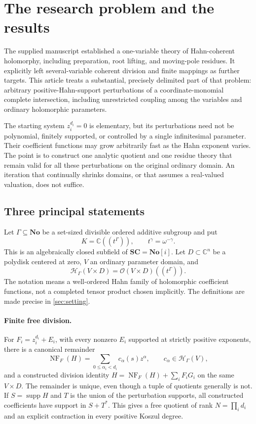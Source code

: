 \documentclass[11pt,letterpaper]{article}
\theoremstyle{definition}
\theoremstyle{remark}
\newcommand{\No}{\mathbf{No}}
\newcommand{\SC}{\mathbf{SC}}
\newcommand{\C}{\mathbb C}
\newcommand{\OO}{\mathcal O}
\newcommand{\HH}{\mathcal H}
\newcommand{\supp}{\operatorname{supp}}
\newcommand{\NF}{\operatorname{NF}}
\numberwithin{equation}{section}
\begin{document}
\section{The research problem and the results}\label{sec:intro}
The supplied manuscript \cite{Supplied} established a one-variable theory of Hahn-coherent holomorphy, including preparation, root lifting, and moving-pole residues. It explicitly left several-variable coherent division and finite mappings as further targets. This article treats a substantial, precisely delimited part of that problem: arbitrary positive-Hahn-support perturbations of a coordinate-monomial complete intersection, including unrestricted coupling among the variables and ordinary holomorphic parameters.

The starting system $z_i^{d_i}=0$ is elementary, but its perturbations need not be polynomial, finitely supported, or controlled by a single infinitesimal parameter. Their coefficient functions may grow arbitrarily fast as the Hahn exponent varies. The point is to construct one analytic quotient and one residue theory that remain valid for all these perturbations on the original ordinary domain. An iteration that continually shrinks domains, or that assumes a real-valued valuation, does not suffice.

\subsection{Three principal statements}
Let $\Gamma\subseteq\No$ be a set-sized divisible ordered additive subgroup and put
\[
 K=\C((t^\Gamma)),\qquad t^\gamma=\omega^{-\gamma}.
\]
This is an algebraically closed subfield of $\SC=\No[i]$. Let $D\subset\C^n$ be a polydisk centered at zero, $V$ an ordinary parameter domain, and
\[
 \HH_\Gamma(V\times D)=\OO(V\times D)((t^\Gamma)).
\]
The notation means a well-ordered Hahn family of holomorphic coefficient functions, not a completed tensor product chosen implicitly. The definitions are made precise in \cref{sec:setting}.

\paragraph{Finite free division.}
For $F_i=z_i^{d_i}+E_i$, with every nonzero $E_i$ supported at strictly positive exponents, there is a canonical remainder
\[
 \NF_F(H)=\sum_{0\le\alpha_i<d_i}c_\alpha(s)z^\alpha,
 \qquad c_\alpha\in\HH_\Gamma(V),
\]
and a constructed division identity $H=\NF_F(H)+\sum_i F_iG_i$ on the same $V\times D$. The remainder is unique, even though a tuple of quotients generally is not. If $S=\supp H$ and $T$ is the union of the perturbation supports, all constructed coefficients have support in $S+T^*$. This gives a free quotient of rank $N=\prod_i d_i$ and an explicit contraction in every positive Koszul degree.
\end{document}
